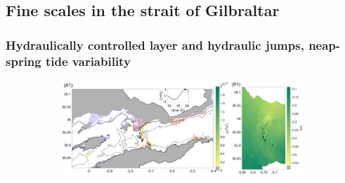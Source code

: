 \subsection{Fine scales in the strait of Gilbraltar}
\label{section3DRes}

\subsubsection{Hydraulically controlled layer and hydraulic jumps, neap-spring tide variability}
\label{section3DResFlow}

\begin{figure}[!h]
 \centering
 
 \begin{subfigure}{\linewidth}
\centering
\includegraphics[width=1\linewidth]{./GBR3D/ME2_19h_p.png}
\end{subfigure}
 

\end{figure}
